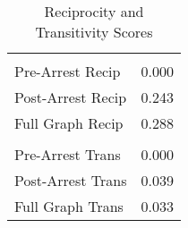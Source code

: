 \begin{table}[!h]

\caption{Reciprocity and Transitivity Scores}
\centering
\begin{tabular}[t]{lr}
\toprule
\addlinespace[0.3em]
\multicolumn{2}{l}{\textbf{Reciprocity}}\\
\hspace{1em}Pre-Arrest Recip & 0.000\\
\hspace{1em}Post-Arrest Recip & 0.243\\
\hspace{1em}Full Graph Recip & 0.288\\
\addlinespace[0.3em]
\multicolumn{2}{l}{\textbf{Transitivity}}\\
\hspace{1em}Pre-Arrest Trans & 0.000\\
\hspace{1em}Post-Arrest Trans & 0.039\\
\hspace{1em}Full Graph Trans & 0.033\\
\bottomrule
\end{tabular}
\end{table}

